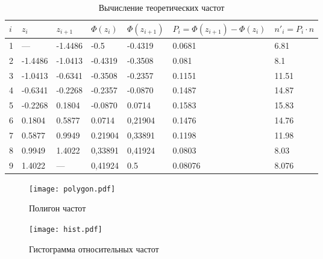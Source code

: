 \documentclass{article}
\theoremstyle{problemstyle}
\begin{document}
\begin{table}[H]
	\centering
	\begin{tabular}{|l||l|l||l|l||l|l|}
		\hline
		\(i\)                               & \(z_i\)           & \(z_{i+1}\) &
		\(\Phi(z_i)\)                       & \(\Phi(z_{i+1})\) &
		\(P_i = \Phi(z_{i+1}) - \Phi(z_i)\) &
		\(n'_i = P_i \cdot n\)
		\\
		\hline
		1                                   & ---               & -1.4486     & -0.5    & -0.4319 & 0.0681  & 6.81  \\
		\hline
		2                                   & -1.4486           & -1.0413     & -0.4319 & -0.3508 & 0.081   & 8.1   \\
		\hline
		3                                   & -1.0413           & -0.6341     & -0.3508 & -0.2357 & 0.1151  & 11.51 \\
		\hline
		4                                   & -0.6341           & -0.2268     & -0.2357 & -0.0870 & 0.1487  & 14.87 \\
		\hline
		5                                   & -0.2268           & 0.1804      & -0.0870 & 0.0714  & 0.1583  & 15.83 \\
		\hline
		6                                   & 0.1804            & 0.5877      & 0.0714  & 0,21904 & 0.1476  & 14.76 \\
		\hline
		7                                   & 0.5877            & 0.9949      & 0.21904 & 0,33891 & 0.1198  & 11.98 \\
		\hline
		8                                   & 0.9949            & 1.4022      & 0,33891 & 0,41924 & 0.0803  & 8.03  \\
		\hline
		9                                   & 1.4022            & ---         & 0,41924 & 0.5     & 0.08076 & 8.076 \\
		\hline
	\end{tabular}
	\caption{Вычисление теоретических частот}\label{table:theoretical_2}
\end{table}





\begin{figure}[H]
	\centering
	\texttt{[image: polygon.pdf]}
	\caption{Полигон частот}\label{fig:polygon}
\end{figure}

\begin{figure}[H]
	\centering
	\texttt{[image: hist.pdf]}
	\caption{Гистограмма относительных частот}\label{fig:hist}
\end{figure}
\end{document}

